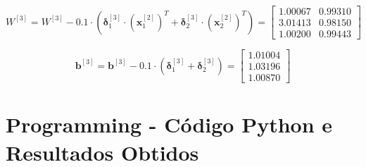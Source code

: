 \documentclass[a4paper,12pt]{article} %
\begin{document}
\begin{enumerate}
\begin{equation*}
    W^{[3]} = W^{[3]} - 0.1 \cdot (\bm{\delta}^{[3]}_1 \cdot (\textbf{x}^{[2]}_1)^T + \bm{\delta}^{[3]}_2 \cdot (\textbf{x}^{[2]}_2)^T) = \begin{bmatrix} 1.00067 & 0.99310 \\
                                                                                                                            3.01413 & 0.98150 \\
                                                                                                                            1.00200 & 0.99443 \end{bmatrix}
\end{equation*}

\begin{equation*}
    \textbf{b}^{[3]} = \textbf{b}^{[3]} - 0.1 \cdot (\bm{\delta}^{[3]}_1 + \bm{\delta}^{[3]}_2) = \begin{bmatrix} 1.01004 \\ 1.03196 \\ 1.00870 \end{bmatrix}
\end{equation*}

\end{enumerate}

\clearpage

\section*{Programming - Código Python e Resultados Obtidos}
\end{document}

